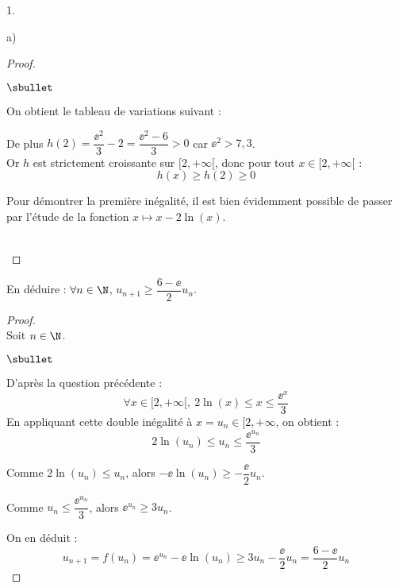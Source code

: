 \documentclass[11pt]{article}%
\begin{document}
\begin{noliste}{1.}
\begin{noliste}{a)}
\begin{proof}
\begin{noliste}{$\sbullet$}
        \newpage


        \noindent
        On obtient le tableau de variations suivant :        

        \begin{center}
        \end{center}
        
        De plus $h(2)=\dfrac{\ee^2}{3}-2=\dfrac{\ee^2-6}{3}>0$ car
        $\ee^2>7,3$.\\
        Or $h$ est strictement croissante sur $[2,+\infty[$, donc pour
        tout $x\in[2,+\infty[$ : 
        \[
        h(x) \geq h(2) \geq 0
        \]
      \end{noliste}
      \conc{On en conclut : $\forall x\in[2,+\infty[$, $x \leq
        \dfrac{\ee^x}{3}$.}
      
      \begin{remark}
        Pour démontrer la première inégalité, il est bien évidemment
        possible de passer par l'étude de la fonction $x\mapsto
        x-2\ln(x)$.
      \end{remark}~\\[-1.4cm]
    \end{proof}
    
  \item En déduire : $\forall n\in\N$, $u_{n+1} \geq
    \dfrac{6-\ee}{2}u_n$.
	
    \begin{proof}~\\
      Soit $n\in\N$. 
      \begin{noliste}{$\sbullet$}
      \item D'après la question précédente :
        \[
        \forall x\in[2,+\infty[, \ 2 \ln(x) \leq x \leq \dfrac{\ee^x}{3}
        \]
        En appliquant cette double inégalité à $x = u_n \in [2,
        +\infty$, on obtient :
        \[
        2\ln(u_n) \leq u_n \leq \dfrac{\ee^{u_n}}{3}
        \]

      \item Comme $2\ln(u_n) \leq u_n$, alors $-\ee \ln(u_n) \geq
        -\dfrac{\ee}{2}u_n$.
        
      \item Comme $u_n \leq \dfrac{\ee^{u_n}}{3}$, alors
        $\ee^{u_n}\geq 3u_n$.
      \end{noliste}
      On en déduit :
      \[
      u_{n+1} = f(u_n) = \ee^{u_n} - \ee \ln(u_n) \geq 3 u_n
      -\dfrac{\ee}{2} u_n = \dfrac{6-\ee}{2}u_n
      \]
    \end{proof}
    


\end{noliste}
\end{noliste}
\end{document}
